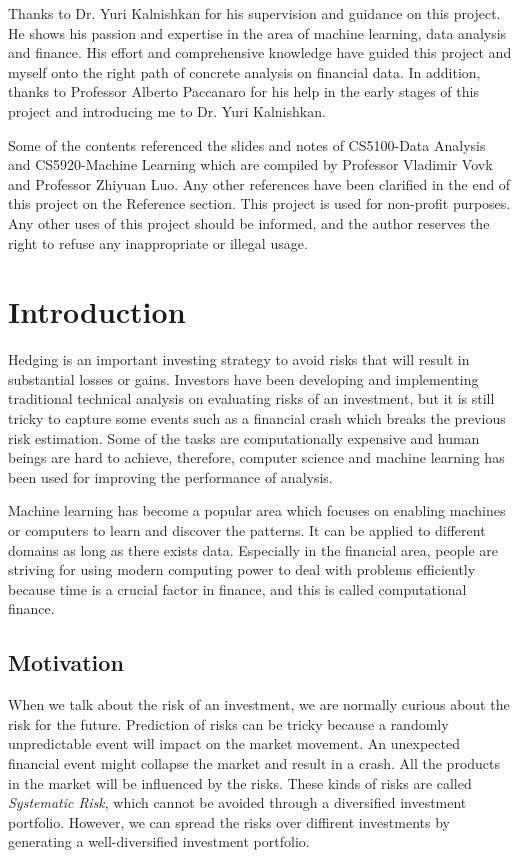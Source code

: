 \documentclass[11pt]{article} %
\theoremstyle{plain}
\theoremstyle{definition}
\begin{document}
Thanks to Dr. Yuri Kalnishkan for his supervision and guidance on this project. He shows his passion and expertise in the area of machine learning, data analysis and finance. His effort and comprehensive knowledge have guided this project and myself onto the right path of concrete analysis on financial data. In addition, thanks to Professor Alberto Paccanaro for his help in the early stages of this project and introducing me to Dr. Yuri Kalnishkan.

Some of the contents referenced the slides and notes of CS5100-Data Analysis and CS5920-Machine Learning which are compiled by Professor Vladimir Vovk and Professor Zhiyuan Luo. Any other references have been clarified in the end of this project on the Reference section. This project is used for non-profit purposes. Any other uses of this project should be informed, and the author reserves the right to refuse any inappropriate or illegal usage.

\clearpage


\section{Introduction}
\setcounter{page}{1}

Hedging is an important investing strategy to avoid risks that will result in substantial losses or gains. Investors have been developing and implementing traditional technical analysis on evaluating risks of an investment, but it is still tricky to capture some events such as a financial crash which breaks the previous risk estimation. Some of the tasks are computationally expensive and human beings are hard to achieve, therefore, computer science and machine learning has been used for improving the performance of analysis.

Machine learning has become a popular area which focuses on enabling machines or computers to learn and discover the patterns. It can be applied to different domains as long as there exists data. Especially in the financial area, people are striving for using modern computing power to deal with problems efficiently because time is a crucial factor in finance, and this is called computational finance.

\subsection{Motivation}

When we talk about the risk of an investment, we are normally curious about the risk for the future. Prediction of risks can be tricky because a randomly unpredictable event will impact on the market movement. An unexpected financial event might collapse the market and result in a crash. All the products in the market will be influenced by the risks. These kinds of risks are called \textsl{Systematic Risk}, which cannot be avoided through a diversified investment portfolio. However, we can spread the risks over diffirent investments by generating a well-diversified investment portfolio.
\end{document}
